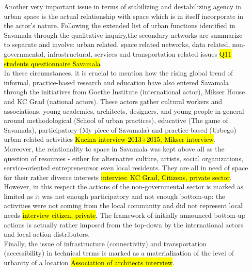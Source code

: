 \documentclass[11pt]{report}
\begin{document}
Another very important issue in terms of stabilizing and destabilizing agency in urban space is the actual relationship with space which is in itself incorporate in the actor's nature. Following the extended list of urban functions identified in Savamala through the qualitative inquiry,\footnotemark the secondary networks are summarize to separate and involve: urban related, space related networks, data related, non-governmental, infrastructural, services and transportation related issues
\hl{Q11 students questionnaire Savamala}
\\
In these circumstances, it is crucial to mention how the rising global trend of informal, practice-based research and education have also entered Savamala through the initiatives from Goethe Institute (international actor), Mikser House and KC Grad (national actors). These actors gather cultural workers and associations, young academics, architects, designers, and young people in general around methodological (School of urban practices), educative (The game of Savamala), participatory (My piece of Savamala) and practice-based (Urbego) urban related activities \hl{Kucina interview 2013+2015, Mikser interview}.
\\
Moreover, the relationality to space in Savamala was kept above all as the question of resources - either for alternative culture, artists, social organizations, service-oriented entrepreneurs\footnotemark or even local residents.  They are all in need of space for their rather diverce interests \hl{intervies: KC Grad, Citizens, private sector}.
However, in this respect the actions of the non-governmental sector is marked as limited as it was not enough participatory  and not enough bottom-up: the activities were not coming from the local community and did not represent local needs \hl{interview citizen, private}. The framework of initially announced bottom-up actions is actually rather imposed from the top-down by the international actors and local action distributors.
\\
Finally, the issue of infrastructure (connectivity) and transportation (accessibility) in technical terms is marked as a materialization of the level of urbanity of a location \hl{Association of architects interview}. 
\end{document}
